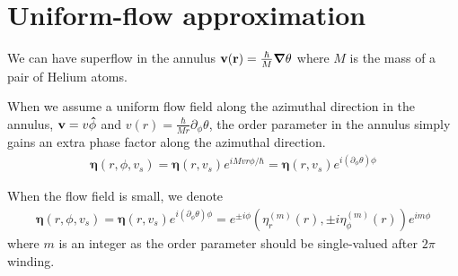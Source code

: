 \documentclass[aps,prl,preprint]{revtex4-2}
\begin{document}
\section{Uniform-flow approximation}
We can have superflow in the annulus $\vb{v}(\vb{r}) = \frac{\hbar}{M}\grad{\theta}$ where $M$ is the mass of a pair of Helium atoms.

When we assume a uniform flow field along the azimuthal direction in the annulus,
$\vb{v} = v\vu{\phi}$ and $v(r) = \frac{\hbar}{Mr}\partial_\phi{\theta}$, the order parameter in the annulus simply gains an extra phase factor along the azimuthal direction.
\begin{align}
    \bm{\eta}(r, \phi, v_s) = \bm{\eta}(r, v_s)e^{iMvr\phi/\hbar} = \bm{\eta}(r, v_s)e^{i(\partial_\phi\theta)\phi}
\end{align}

When the flow field is small, we denote
\begin{align}
    \bm{\eta}(r, \phi, v_s) = \bm{\eta}(r, v_s)e^{i(\partial_\phi\theta)\phi} = e^{\pm i\phi}\left(\eta_r^{(m)}(r), \pm i\eta_\phi^{(m)}(r)\right)e^{im\phi}\label{uniform_flow_eta}
\end{align}
where $m$ is an integer as the order parameter should be single-valued after $2\pi$ winding.
\end{document}
